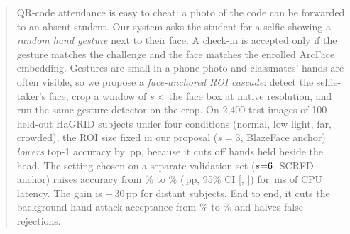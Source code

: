\begin{abstract}
QR-code attendance is easy to cheat: a photo of the code can be forwarded to an absent student. Our system asks
the student for a selfie showing a \emph{random hand gesture} next to their face. A check-in is accepted only if
the gesture matches the challenge and the face matches the enrolled ArcFace embedding. Gestures are small in a
phone photo and classmates' hands are often visible, so we propose a \emph{face-anchored ROI cascade}: detect the
selfie-taker's face, crop a window of $s\times$ the face box at native resolution, and run the same gesture
detector on the crop. On 2,400 test images of 100 held-out HaGRID subjects under four conditions (normal, low
light, far, crowded), the ROI size fixed in our proposal ($s{=}3$, BlazeFace anchor) \emph{lowers} top-1 accuracy
by \mpSAllD\,pp, because it cuts off hands held beside the head. The setting chosen on a separate validation set
($s{=}\mpTScale$, SCRFD anchor) raises accuracy from \mpBaseAllAcc\% to \mpTAllAcc\% (\mpTAllD\,pp, 95\% CI
[\mpTAllLo, \mpTAllHi]) for \latExtramediapipe\,ms of CPU latency. The gain is +\,30\,pp for distant subjects.
End to end, it cuts the background-hand attack acceptance from \mpFARbgFull\% to \mpFARbgRoiSix\% and halves
false rejections.
\end{abstract}
